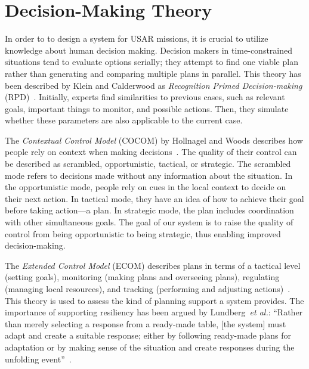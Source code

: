 \documentclass[conference,10pt,letter]{IEEEtran}
\def\etal{\textit{et al.}}
\begin{document}

\section{Decision-Making Theory} \label{sec:theory}
In order to to design a system for USAR missions, it is crucial to utilize knowledge about human decision making. Decision makers in time-constrained situations tend to evaluate options serially; they attempt to find one viable plan rather than generating and comparing multiple plans in parallel. This theory has been described by Klein and Calderwood as \emph{Recognition Primed Decision-making} (RPD)~\cite{KleinCalderwood}. Initially, experts find similarities to previous cases, such as relevant goals, important things to monitor, and possible actions. Then, they simulate whether these parameters are also applicable to the current case.

The \emph{Contextual Control Model} (COCOM) by Hollnagel and Woods describes how people rely on context when making decisions~\cite{hollnagel2005joint}. The quality of their control can be described as scrambled, opportunistic, tactical, or strategic. The scrambled mode refers to decisions made without any information about the situation. In the opportunistic mode, people rely on cues in the local context to decide on their next action. In tactical mode, they have an idea of how to achieve their goal before taking action---a plan. In strategic mode, the plan includes coordination with other simultaneous goals. The goal of our system is to raise the quality of control from being opportunistic to being strategic, thus enabling improved decision-making.

The \emph{Extended Control Model} (ECOM) describes plans in terms of a tactical level (setting goals), monitoring (making plans and overseeing plans), regulating (managing local resources), and tracking (performing and adjusting actions)~\cite{hollnagel2005joint}. This theory is used to assess the kind of planning support a system provides. The importance of supporting resiliency has been argued by Lundberg~\etal : ``Rather than merely selecting a response from a ready-made table, [the system] must adapt and create a suitable response; either by following ready-made plans for adaptation or by making sense of the situation and create responses during the unfolding event''~\cite{Lundberg2012}.
\end{document}
